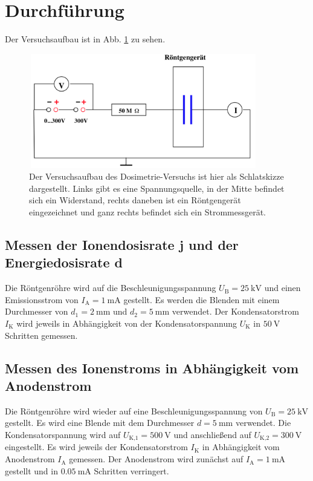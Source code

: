 \section{Durchführung}
\label{sec:Durchführung}

Der Versuchsaufbau ist in Abb. \ref{fig:aufbau} zu sehen.
\begin{figure}
    \centering
    \includegraphics[width=10cm, height=5cm]{build/aufbau.png}
    \caption{Der Versuchsaufbau des Dosimetrie-Versuchs ist hier als Schlatskizze dargestellt. Links gibt es eine Spannungsquelle, in der Mitte befindet sich ein Widerstand, rechts daneben ist ein Röntgengerät eingezeichnet und ganz rechts befindet sich ein Strommessgerät. \cite{V607}}
    \label{fig:aufbau}
\end{figure}

\subsection{Messen der Ionendosisrate j und der Energiedosisrate d}
Die Röntgenröhre wird auf die Beschleunigungsspannung
$U_\text{B} = \SI{25}{\kilo\volt}$ und einen Emissionsstrom 
von $I_\text{A} = \SI{1}{\milli\ampere}$ gestellt.
Es werden die Blenden mit einem Durchmesser von
$d_1 = \SI{2}{\milli\meter}$ und $d_2 = \SI{5}{\milli\meter}$ 
verwendet.
\newline
Der Kondensatorstrom $I_\text{K}$ wird jeweils in Abhängigkeit
von der Kondensatorspannung $U_\text{K}$ in $\SI{50}{\volt}$ 
Schritten gemessen.

\subsection{Messen des Ionenstroms in Abhängigkeit vom Anodenstrom}
Die Röntgenröhre wird wieder auf eine Beschleunigungsspannung von
$U_\text{B} = \SI{25}{\kilo\volt}$ gestellt. Es wird eine
Blende mit dem Durchmesser $d = \SI{5}{\milli\meter}$
verwendet. Die Kondensatorspannung wird auf 
$U_\text{K,1} = \SI{500}{\volt}$ und anschließend auf
$U_\text{K,2} = \SI{300}{\volt}$ eingestellt.
\newline
Es wird jeweils der Kondensatorstrom $I_\text{K}$ in
Abhängigkeit vom Anodenstrom $I_\text{A}$ gemessen.
Der Anodenstrom wird zunächst auf $I_\text{A} = \SI{1}{\milli\ampere}$
gestellt und in $\SI{0.05}{\milli\ampere}$ Schritten verringert.

